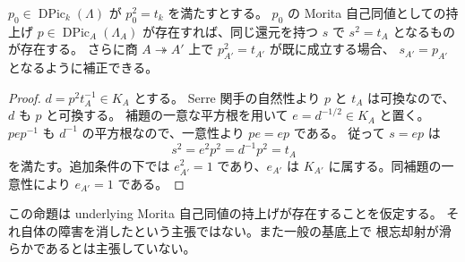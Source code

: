 \begin{proposition}[平方関係の補正]
\label{prop:artin-serre-square-correction}
$p_0\in\operatorname{DPic}_k(\Lambda)$ が $p_0^2=t_k$ を満たすとする。
$p_0$ の Morita 自己同値としての持上げ $p\in\operatorname{DPic}_A(\Lambda_A)$
が存在すれば、同じ還元を持つ $s$ で $s^2=t_A$ となるものが存在する。
さらに商 $A\twoheadrightarrow A'$ 上で $p_{A'}^2=t_{A'}$ が既に成立する場合、
$s_{A'}=p_{A'}$ となるように補正できる。
\end{proposition}
\begin{proof}
$d=p^2t_A^{-1}\in K_A$ とする。
Serre 関手の自然性より $p$ と $t_A$ は可換なので、$d$ も $p$ と可換する。
補題の一意な平方根を用いて $e=d^{-1/2}\in K_A$ と置く。
$pep^{-1}$ も $d^{-1}$ の平方根なので、一意性より $pe=ep$ である。
従って $s=ep$ は
\[
 s^2=e^2p^2=d^{-1}p^2=t_A
\]
を満たす。追加条件の下では $e_{A'}^2=1$ であり、$e_{A'}$ は
$K_{A'}$ に属する。同補題の一意性により $e_{A'}=1$ である。
\end{proof}

この命題は underlying Morita 自己同値の持上げが存在することを仮定する。
それ自体の障害を消したという主張ではない。また一般の基底上で
根忘却射が滑らかであるとは主張していない。

